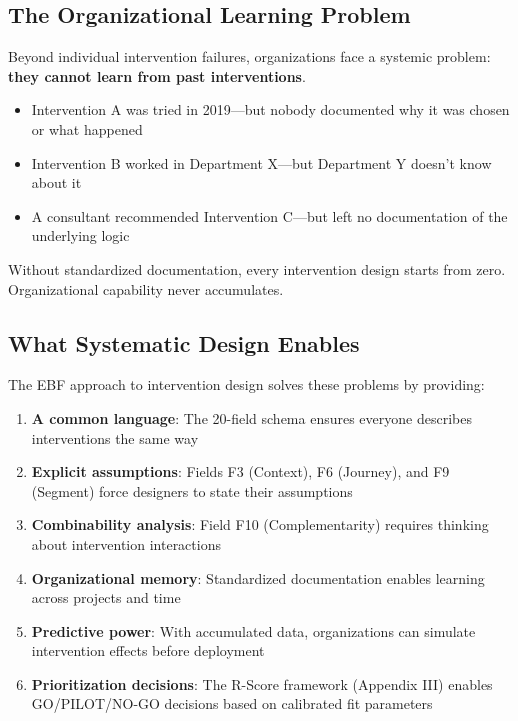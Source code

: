 \subsection{The Organizational Learning Problem}

Beyond individual intervention failures, organizations face a systemic problem: \textbf{they cannot learn from past interventions}.

\begin{itemize}
\item Intervention A was tried in 2019---but nobody documented why it was chosen or what happened
\item Intervention B worked in Department X---but Department Y doesn't know about it
\item A consultant recommended Intervention C---but left no documentation of the underlying logic
\end{itemize}

Without standardized documentation, every intervention design starts from zero. Organizational capability never accumulates.

\subsection{What Systematic Design Enables}

The EBF approach to intervention design solves these problems by providing:

\begin{enumerate}
\item \textbf{A common language}: The 20-field schema ensures everyone describes interventions the same way
\item \textbf{Explicit assumptions}: Fields F3 (Context), F6 (Journey), and F9 (Segment) force designers to state their assumptions
\item \textbf{Combinability analysis}: Field F10 (Complementarity) requires thinking about intervention interactions
\item \textbf{Organizational memory}: Standardized documentation enables learning across projects and time
\item \textbf{Predictive power}: With accumulated data, organizations can simulate intervention effects before deployment
\item \textbf{Prioritization decisions}: The R-Score framework (Appendix III) enables GO/PILOT/NO-GO decisions based on calibrated fit parameters
\end{enumerate}

